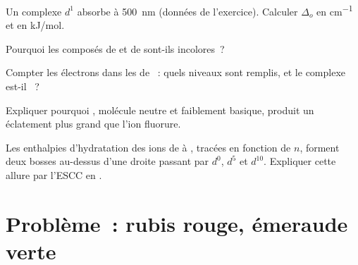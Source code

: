 \begin{exercise}[$\star\star$]\label{exo:b2:ligand-field:8}
Un complexe $d^1$ absorbe à \qty{500}{nm} (données de l'exercice). Calculer $\Delta_o$ en \unit{cm^{-1}} et
en \unit{kJ/mol}.
\end{exercise}

\begin{exercise}[$\star\star$]\label{exo:b2:ligand-field:9}
Pourquoi les composés de  et de  sont-ils incolores~?
\end{exercise}

\begin{exercise}[$\star\star\star$]\label{exo:b2:ligand-field:10}
Compter les électrons dans les  de ~: quels niveaux sont remplis,
et le complexe est-il ~?
\end{exercise}

\begin{exercise}[$\star\star\star$]\label{exo:b2:ligand-field:11}
Expliquer pourquoi , molécule neutre et faiblement basique, produit un éclatement plus grand que
l'ion fluorure.
\end{exercise}

\begin{exercise}[$\star\star\star$]\label{exo:b2:ligand-field:12}
Les enthalpies d'hydratation des ions  de  à , tracées en fonction de $n$, forment
deux bosses au-dessus d'une droite passant par $d^0$, $d^5$ et $d^{10}$. Expliquer cette allure par
l'ESCC en .
\end{exercise}

\section{Problème~: rubis rouge, émeraude verte}

